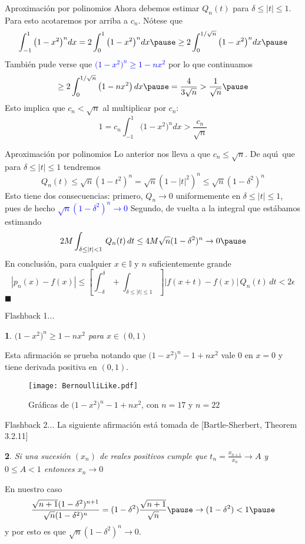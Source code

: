 \documentclass[xcolor=dvipsnames,10pt,handout, draft]{beamer}
\newcommand{\intunit}{\mathbb I}
\newtheorem*{afirma}{}
\begin{document}
\begin{frame}{Aproximaci\'on por polinomios}
Ahora debemos estimar $Q_n(t)$ para $\delta\leq|t|\leq1$.
\vskip5pt\pause
Para esto acotaremos por arriba a $c_n$. \pause N\'otese que 
$$\int_{-1}^{1}\big(1-x^2\big)^ndx=2\int_{0}^{1}\big(1-x^2\big)^ndx\pause\geq2\int_{0}^{1/\sqrt n}\big(1-x^2\big)^ndx\pause$$
Tambi\'en pude verse que \textcolor{blue}{$\big(1-x^2\big)^n\geq 1-nx^2$} \pause por lo que continuamos 
$$\geq2\int_{0}^{1/\sqrt n}\big(1-nx^2\big)\,dx\pause=\frac{4}{3\sqrt n}>\frac{1}{\sqrt n}\pause$$
Esto implica que $c_n<\sqrt n$ al multiplicar por $c_n$:
$$1=c_n\int_{-1}^{1}\big(1-x^2\big)^ndx>\frac{c_n}{\sqrt n}$$
\end{frame}


\begin{frame}{Aproximaci\'on por polinomios}
Lo anterior nos lleva a que $c_n\leq\sqrt n$.
\pause\vskip5pt
De aqu\'\i\ que para $\delta\leq|t|\leq1$ tendremos 
$$Q_n(t)\leq\sqrt n(1-t^2)^n=\sqrt n(1-|t|^2)^n\leq\sqrt n(1-\delta^2)^n$$
\pause
Esto tiene dos consecuencias: primero, $Q_n\to0$ uniformemente en $\delta\leq|t|\leq1$, pues de hecho \textcolor{blue}{$\sqrt n(1-\delta^2)^n\to0$}
\vskip5pt\pause
Segundo, de vuelta a la integral que est\'abamos estimando 
$$2M\int_{\delta\leq|t|<1}\,Q_n(t)\,dt\leq 4M\sqrt n(1-\delta^2)^n\to 0\pause$$
En conclusi\'on, para cualquier $x\in \intunit$ y $n$ suficientemente grande
$$|p_n(x)-f(x)|\leq\left[\int_{-\delta}^{\delta}+\int_{\delta\leq|t|\leq1}\right]\big|f(x+t)-f(x)\big|\,Q_n(t)\,dt<2\epsilon$$
\hfill$\blacksquare$
\end{frame}


\begin{frame}{Flashback 1...}
\begin{afirma}
$\big(1-x^2\big)^n\geq 1-nx^2$ para $x\in(0,1)$\pause
\end{afirma}
Esta afirmaci\'on se prueba notando que $\big(1-x^2\big)^n- 1+nx^2$ vale $0$ en $x=0$ y tiene derivada positiva en $(0,1)$.\pause
\begin{figure}[ht]
\texttt{[image: BernoulliLike.pdf]}
\caption{Gr\'aficas de $\big(1-x^2\big)^n- 1+nx^2$, con $n=17$ y $n=22$}
\end{figure}
\end{frame}

\begin{frame}{Flashback 2...}
La siguiente afirmaci\'on est\'a tomada de [Bartle-Sherbert, Theorem 3.2.11]  
\begin{afirma}
Si una sucesi\'on $(x_n)$ de reales positivos cumple que $\displaystyle t_n=\frac{x_{n+1}}{x_n}\to A$ y $0\leq A<1$ entonces $x_n\to0$\pause
\end{afirma}
En nuestro caso 
$$\frac{\sqrt{n+1}(1-\delta^2)^{n+1}}{\sqrt n(1-\delta^2)^n}=(1-\delta^2)\frac{\sqrt{n+1}}{\sqrt n}\pause\to(1-\delta^2)<1\pause$$
y por esto es que $\sqrt n(1-\delta^2)^n\to0$.
\end{frame}
\end{document}
